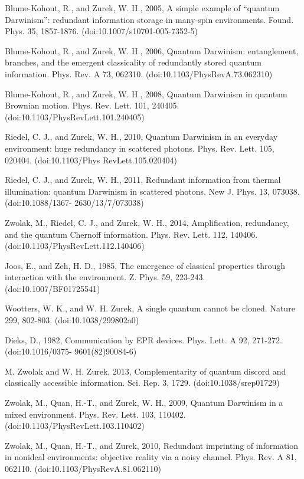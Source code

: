 \documentclass[aps,amsmath,amssymb,amsfonts,floatfix]{revtex4-1}
\newcommand{\+}         {\dagger}
\begin{document}
{{{\begin{references}
 Blume-Kohout, R., and Zurek, W. H., 2005, A simple example of ``quantum Darwinism'':
redundant information storage in many-spin environments. Found. Phys. 35, 1857-1876.
(doi:10.1007/s10701-005-7352-5)

 Blume-Kohout, R., and Zurek, W. H., 2006, Quantum Darwinism: entanglement, branches, and the
emergent classicality of redundantly stored quantum information. Phys. Rev. A 73, 062310.
(doi:10.1103/PhysRevA.73.062310)

 Blume-Kohout, R., and Zurek, W. H., 2008, Quantum Darwinism in quantum Brownian motion. Phys. Rev. Lett. 101, 240405. (doi:10.1103/PhysRevLett.101.240405)

 Riedel, C. J., and Zurek, W. H., 2010, Quantum Darwinism in an everyday environment:
huge redundancy in scattered photons. Phys. Rev. Lett. 105, 020404. (doi:10.1103/Phys
RevLett.105.020404)

 Riedel, C. J., and Zurek, W. H., 2011, Redundant information from thermal illumination:
quantum Darwinism in scattered photons. New J. Phys. 13, 073038. (doi:10.1088/1367-
2630/13/7/073038)

 Zwolak, M., Riedel, C. J., and Zurek, W. H., 2014, Amplification, redundancy, and the quantum Chernoff
information. Phys. Rev. Lett. 112, 140406. (doi:10.1103/PhysRevLett.112.140406)

 Joos, E., and Zeh, H. D., 1985, The emergence of classical properties through interaction with the
environment. Z. Phys. 59, 223-243. (doi:10.1007/BF01725541)

 Wootters, W. K., and W. H. Zurek, A single quantum cannot be cloned. Nature 299, 802-803.
(doi:10.1038/299802a0)

 Dieks, D., 1982, Communication by EPR devices. Phys. Lett. A 92, 271-272. (doi:10.1016/0375-
9601(82)90084-6)

 M. Zwolak and W. H. Zurek, 2013, Complementarity of quantum discord and classically accessible
information. Sci. Rep. 3, 1729. (doi:10.1038/srep01729)

 Zwolak, M., Quan, H.-T., and Zurek, W. H., 2009, Quantum Darwinism in a mixed environment. Phys.
Rev. Lett. 103, 110402. (doi:10.1103/PhysRevLett.103.110402)

 Zwolak, M., Quan, H.-T., and Zurek, 2010, Redundant imprinting of information in
nonideal environments: objective reality via a noisy channel. Phys. Rev. A 81, 062110.
(doi:10.1103/PhysRevA.81.062110)


\end{references}}}}
\end{document}
